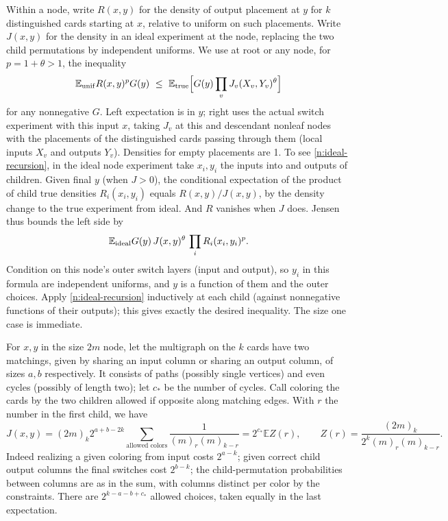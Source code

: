 Within a node, write \(R(x,y)\) for the density of output placement at \(y\) for \(k\) distinguished cards starting at \(x\), relative to uniform on such placements. Write \(J(x,y)\) for the density in an ideal experiment at the node, replacing the two child permutations by independent uniforms. We use at root or any node, for \(p=1+\theta>1\), the inequality
\begin{equation}
\mathbb E_{\rm unif} R(x,y)^p G(y)
\ \le\
\mathbb E_{\rm true}\Big[G(y)\prod_v J_v(X_v,Y_v)^\theta\Big]
\label{n:ideal-recursion}
\end{equation}
for any nonnegative \(G\). Left expectation is in \(y\); right uses the actual switch experiment with this input \(x\), taking \(J_v\) at this and descendant nonleaf nodes with the placements of the distinguished cards passing through them (local inputs \(X_v\) and outputs \(Y_v\)). Densities for empty placements are 1. To see \eqref{n:ideal-recursion}, in the ideal node experiment take \(x_i,y_i\) the inputs into and outputs of children. Given final \(y\) (when \(J>0\)), the conditional expectation of the product of child true densities \(R_i(x_i,y_i)\) equals \(R(x,y)/J(x,y)\), by the density change to the true experiment from ideal. And \(R\) vanishes when \(J\) does. Jensen thus bounds the left side by
\[
\mathbb E_{\rm ideal} G(y)\,J(x,y)^\theta\,\prod_i R_i(x_i,y_i)^p.
\]
Condition on this node's outer switch layers (input and output), so \(y_i\) in this formula are independent uniforms, and \(y\) is a function of them and the outer choices. Apply \eqref{n:ideal-recursion} inductively at each child (against nonnegative functions of their outputs); this gives exactly the desired inequality. The size one case is immediate.

For \(x,y\) in the size \(2m\) node, let the multigraph on the \(k\) cards have two matchings, given by sharing an input column or sharing an output column, of sizes \(a,b\) respectively. It consists of paths (possibly single vertices) and even cycles (possibly of length two); let \(c_*\) be the number of cycles. Call coloring the cards by the two children allowed if opposite along matching edges. With \(r\) the number in the first child, we have
\begin{equation}
J(x,y)=(2m)_k 2^{a+b-2k}
  \sum_{\text{allowed colors}}\frac{1}{(m)_r(m)_{k-r}}
=2^{c_*}\mathbb E Z(r),\qquad
 Z(r)=\frac{(2m)_k}{2^k(m)_r(m)_{k-r}}.
\label{n:node-colors}
\end{equation}
Indeed realizing a given coloring from input costs \(2^{a-k}\); given correct child output columns the final switches cost \(2^{b-k}\); the child-permutation probabilities between columns are as in the sum, with columns distinct per color by the constraints. There are \(2^{k-a-b+c_*}\) allowed choices, taken equally in the last expectation.

